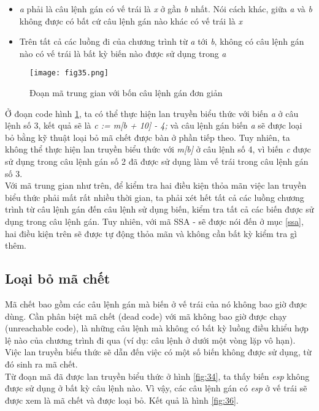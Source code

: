 \begin{itemize}
	\item \textit{a} phải là câu lệnh gán có vế trái là \textit{x} ở gần \textit{b} nhất. Nói cách khác, giữa \textit{a} và \textit{b} không được có bất cứ câu lệnh gán nào khác có vế trái là \textit{x}
	\item Trên tất cả các luồng đi của chương trình từ \textit{a} tới \textit{b}, không có câu lệnh gán nào có vế trái là bất kỳ biến nào được sử dụng trong \textit{a}
\end{itemize}
\begin{figure}[h]
	\centering
	\texttt{[image: fig35.png]}
	\caption{Đoạn mã trung gian với bốn câu lệnh gán đơn giản}
	\label{fig:35}
\end{figure}
Ở đoạn code hình \ref{fig:35}, ta có thể thực hiện lan truyền biểu thức với biến \textit{a} ở câu lệnh số 3, kết quả sẽ là \textit{c := m[b + 10] - 4;} và câu lệnh gán biến \textit{a} sẽ được loại bỏ bằng kỹ thuật loại bỏ mã chết được bàn ở phần tiếp theo. Tuy nhiên, ta không thể thực hiện lan truyền biểu thức với \textit{m[b]} ở câu lệnh số 4, vì biến \textit{c} được sử dụng trong câu lệnh gán số 2 đã được sử dụng làm vế trái trong câu lệnh gán số 3.\\

Với mã trung gian như trên, để kiểm tra hai điều kiện thỏa mãn việc lan truyền biểu thức phải mất rất nhiều thời gian, ta phải xét hết tất cả các luồng chương trình từ câu lệnh gán đến câu lệnh sử dụng biến, kiểm tra tất cả các biến được sử dụng trong câu lệnh gán. Tuy nhiên, với mã SSA - sẽ được nói đến ở mục \ref{ssa}, hai điều kiện trên sẽ được tự động thỏa mãn và không cần bất kỳ kiểm tra gì thêm.
\subsection{Loại bỏ mã chết}

Mã chết bao gồm các câu lệnh gán mà biến ở vế trái của nó không bao giờ được dùng. Cần phân biệt mã chết (dead code) với mã không bao giờ được chạy (unreachable code), là những câu lệnh mà không có bất kỳ luồng điều khiểu hợp lệ nào của chương trình đi qua (ví dụ: câu lệnh ở dưới một vòng lặp vô hạn). Việc lan truyền biểu thức sẽ dẫn đến việc có một số biến không được sử dụng, từ đó sinh ra mã chết. \\
Từ đoạn mã đã được lan truyền biểu thức ở hình \ref{fig:34}, ta thấy biến \textit{esp} không được sử dụng ở bất kỳ câu lệnh nào. Vì vậy, các câu lệnh gán có \textit{esp} ở vế trái sẽ được xem là mã chết và được loại bỏ. Kết quả là hình \ref{fig:36}.

